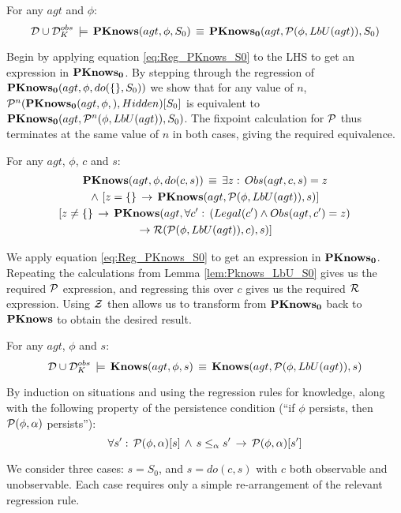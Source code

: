 \begin{lemma}
\label{lem:Pknows_LbU_S0}For any $agt$ and $\phi$:\[
\mathcal{D}\cup\mathcal{D}_{K}^{obs}\,\models\,\mathbf{PKnows}(agt,\phi,S_{0})\,\equiv\,\mathbf{PKnows_{0}}(agt,\mathcal{P}(\phi,LbU(agt)),S_{0})\]

\end{lemma}
\begin{proofsketch}
Begin by applying equation \eqref{eq:Reg_PKnows_S0} to the LHS to
get an expression in $\mathbf{PKnows_{0}}$. By stepping through the regression
of $\mathbf{PKnows_{0}}(agt,\phi,do(\{\},S_{0}))$ we show that for any value
of $n$, $\mathcal{P}^{n}(\mathbf{PKnows_{0}}(agt,\phi,),Hidden)[S_{0}]$ is equivalent
to $\mathbf{PKnows_{0}}(agt,\mathcal{P}^{n}(\phi,LbU(agt)),S_{0})$. The fixpoint calculation
for $\mathcal{P}$ thus terminates at the same value of $n$ in both cases,
giving the required equivalence. 
\end{proofsketch}
\begin{lemma}
\label{lem:Pknows_LbU_do}For any $agt$, $\phi$, $c$ and $s$:\begin{multline*}
\mathbf{PKnows}(agt,\phi,do(c,s))\,\equiv\,\exists z:\, Obs(agt,c,s)=z\\
\wedge\,\left[z=\{\}\,\rightarrow\,\mathbf{PKnows}(agt,\mathcal{P}(\phi,LbU(agt)),s)\right]\\
\left[z\neq\{\}\,\rightarrow\,\mathbf{PKnows}(agt,\forall c':\,\left(Legal(c')\wedge Obs(agt,c')=z\right)\right.\\
\left.\rightarrow\mathcal{R}(\mathcal{P}(\phi,LbU(agt)),c),s)\right]\end{multline*}

\end{lemma}
\begin{proofsketch}
We apply equation \eqref{eq:Reg_PKnows_S0} to get an expression in
$\mathbf{PKnows_{0}}$. Repeating the calculations from Lemma \ref{lem:Pknows_LbU_S0}
gives us the required $\mathcal{P}$ expression, and regressing this over
$c$ gives us the required $\mathcal{R}$ expression. Using $\mathcal{Z}$ then
allows us to transform from $\mathbf{PKnows_{0}}$ back to $\mathbf{PKnows}$ to obtain
the desired result. 
\end{proofsketch}
\begin{lemma}
\label{lem:Knows_impl_KnowsLbU}For any $agt$, $\phi$ and $s$:\[
\mathcal{D}\cup\mathcal{D}_{K}^{obs}\,\models\,\mathbf{Knows}(agt,\phi,s)\,\equiv\,\mathbf{Knows}(agt,\mathcal{P}(\phi,LbU(agt)),s)\]

\end{lemma}
\begin{proofsketch}
By induction on situations and using the regression rules for knowledge,
along with the following property of the persistence condition ({}``if
$\phi$ persists, then $\mathcal{P}(\phi,\alpha)$ persists''):\[
\forall s':\,\mathcal{P}(\phi,\alpha)[s]\,\wedge\, s\leq_{\alpha}s'\,\rightarrow\,\mathcal{P}(\phi,\alpha)[s']\]


We consider three cases: $s=S_{0}$, and $s=do(c,s)$ with $c$ both
observable and unobservable. Each case requires only a simple re-arrangement
of the relevant regression rule. 
\end{proofsketch}
